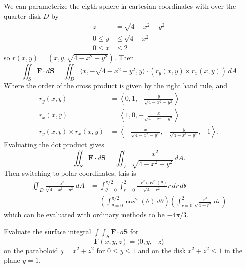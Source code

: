 \documentclass{article}
\newenvironment{problem}[2][Problem]{\begin{trivlist}
\item[\hskip \labelsep {\bfseries #1}\hskip \labelsep {\bfseries #2.}]}{\end{trivlist}}
\newenvironment{solution}[1][Solution.]{\begin{trivlist}
\item[\hskip \labelsep {\bfseries #1}]}{\end{trivlist}}
\begin{document}
\begin{solution} $ $\\
  We can parameterize the eigth sphere in cartesian coordinates with over the quarter disk $D$ by \begin{align*}
    z &= \sqrt{4-x^2-y^2} \\
    0 \leq y &\leq \sqrt{4-x^2} \\
    0 \leq x &\leq 2
  \end{align*} so $r(x,y) = (x,y,\sqrt{4-x^2-y^2})$.
  Then \[
    \iint_S \mathbf F \cdot d\mathbf S
    = \iint_D
      \langle x, -\sqrt{4-x^2-y^2}, y \rangle
      \cdot
    (r_y(x,y) \times r_x(x,y))\,
    dA
  \]
  Where the order of the cross product is given by the right hand rule, and  \begin{align*}
    r_y(x,y) &= \left\langle 0, 1, -\frac{y}{\sqrt{4 - x^2 -y^2}} \right\rangle \\
    r_x(x,y) &= \left\langle 1, 0, -\frac{x}{\sqrt{4 - x^2 -y^2}} \right\rangle \\
    r_y(x,y) \times r_x(x,y) &= \left\langle
      -\frac{x}{\sqrt{4 - x^2 -y^2}},
      -\frac{y}{\sqrt{4 - x^2 -y^2}},
      -1
    \right\rangle.
  \end{align*}
  Evaluating the dot product gives \[
    \iint_S \mathbf F \cdot d\mathbf S =
    \iint_D \frac{-x^2}{\sqrt{4 - x^2 -y^2}}\, dA.
  \]
  Then switching to polar coordinates, this is \begin{align*}
    \iint_D \frac{-x^2}{\sqrt{4 - x^2 -y^2}}\, dA &=
    \int_{\theta=0}^{\pi/2}\int_{r=0}^2 \frac{-r^2\cos^2(\theta)}{\sqrt{4-r^2}}r\,dr\,d\theta \\
    &=\left(\int_{\theta=0}^{\pi/2} \cos^2(\theta)\,d\theta\right)
    \left(\int_{r=0}^2 \frac{-r^3}{\sqrt{4-r^2}}\,dr\right)
  \end{align*}
  which can be evaluated with ordinary methods to be $-4\pi/3$.
\end{solution}
\pagebreak
\begin{problem}{13.7.27}
  Evaluate the surface integral $\int\int_S \mathbf F \cdot d\mathbf S$ for \[
    \mathbf F(x, y, z) = \langle 0, y, -z \rangle
  \] on the paraboloid $y = x^2 + z^2$ for $0 \leq y \leq 1$ and on the disk
  $x^2 + z^2 \leq 1$ in the plane $y=1$.
\end{problem}
\end{document}
